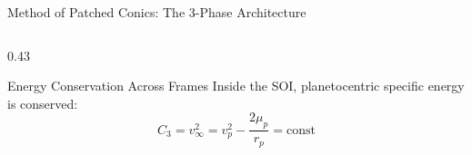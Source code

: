 \documentclass[aspectratio=169, 10pt]{beamer}
\begin{document}
\begin{frame}{Method of Patched Conics: The 3-Phase Architecture}
\begin{columns}[t]
\begin{column}{0.43\textwidth}
            \vspace{-0.1cm}

            \begin{alertblock}{Energy Conservation Across Frames}
                \scriptsize
                Inside the SOI, planetocentric specific energy is conserved:
                \vspace{-0.08cm}
                \begin{equation*}
                    C_3 = v_\infty^2 = v_p^2 - \frac{2\mu_p}{r_p} = \text{const}
                \end{equation*}
            \end{alertblock}
        \end{column}
    \end{columns}
\end{frame}
\end{document}
